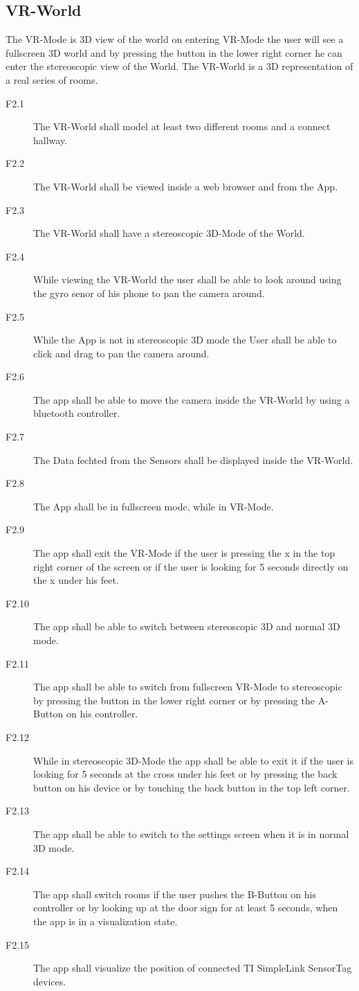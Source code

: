 \subsection{VR-World}
  The VR-Mode is 3D view of the world on entering VR-Mode the user will see a fullscreen 3D world and by pressing the button in the lower right corner he can enter the  stereoscopic view of the World.
  The VR-World is a 3D representation of a real series of rooms.
  \begin{description}
    \item[F2.1] The VR-World shall model at least two different rooms and a connect hallway.
    \item[F2.2] The VR-World shall be viewed inside a web browser and from the App.
    \item[F2.3] The VR-World shall have a stereoscopic 3D-Mode of the World.
    \item[F2.4] While viewing the VR-World the user shall be able to look around using the gyro senor of his phone to pan the camera around.
    \item[F2.5] While the App is not in stereoscopic 3D mode the User shall be able to click and drag to pan the camera around.
    \item[F2.6] The app shall be able to move the camera inside the VR-World by using a bluetooth controller.
    \item[F2.7] The Data fechted from the Sensors shall be displayed inside the VR-World.
    \item[F2.8] The App shall be in fullscreen mode, while in VR-Mode.
    \item[F2.9] The app shall exit the VR-Mode if the user is pressing the x in the top right corner of the screen or if the user is looking for 5 seconds directly on the x under his feet.
    \item[F2.10] The app shall be able to switch between stereoscopic 3D and normal 3D mode.
    \item[F2.11] The app shall be able to switch from fullscreen VR-Mode to stereoscopic by pressing the button in the lower right corner or by pressing the A-Button on his controller.
    \item[F2.12] While in stereoscopic 3D-Mode the app shall be able to exit it if the user is looking for 5 seconds at the cross under his feet or by pressing the back button on his device or by touching the back button in the top left corner.
    \item[F2.13] The app shall be able to switch to the settings screen when it is in normal 3D mode.
    \item[F2.14] The app shall switch rooms if the user pushes the B-Button on his controller or by looking up at the door sign for at least 5 seconds, when the app is in a visualization state.
    \item[F2.15] The app shall visualize the position of connected TI SimpleLink SensorTag devices.
  \end{description}


